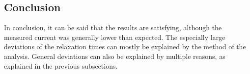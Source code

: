 \subsection{Conclusion}
In conclusion, it can be said that the results are satisfying, although the measured current was generally lower than expected.
The especially large deviations of the relaxation times can mostly be explained by the method of the analysis. 
General deviations can also be explained by multiple reasons, as explained in the previous subsections. 
